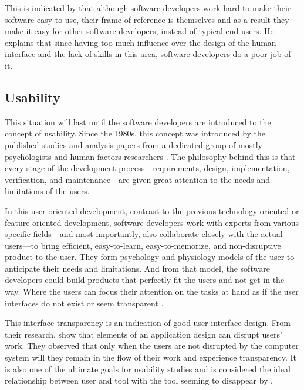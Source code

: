 \documentclass[a4paper,titlepage]{article}
\begin{document}
This is indicated by \citet{inmates:cooper} that although software
developers work hard to make their software easy to use, their frame
of reference is themselves and as a result they make it easy for other
software developers, instead of typical end-users. He explains that
since having too much influence over the design of the human interface
and the lack of skills in this area, software developers do a poor job
of it.

\subsection{Usability}
This situation will last until the software developers are introduced
to the concept of usability. Since the 1980s, this concept was
introduced by the published studies and analysis papers from a
dedicated group of mostly psychologists and human factors researchers
\citep{human:rubinstein, friendly:simpson, human:shneiderman,
  human:brown, software:dumas}. The philosophy behind this is that
every stage of the development process---requirements, design,
implementation, verification, and maintenance---are given great
attention to the needs and limitations of the users.

In this user-oriented development, contrast to the previous
technology-oriented or feature-oriented development, software
developers work with experts from various specific fields---and most
importantly, also collaborate closely with the actual users---to bring
efficient, easy-to-learn, easy-to-memorize, and non-disruptive product
to the user. They form psychology and physiology models of the user to
anticipate their needs and limitations. And from that model, the
software developers could build products that perfectly fit the users
and not get in the way. Where the users can focus their attention on
the tasks at hand as if the user interfaces do not exist or seem
transparent \citep{computer:weiser}.

This interface transparency is an indication of good user interface
design. From their research, \citet{transparency:holtzblatt} show that
elements of an application design can disrupt users' work. They
observed that only when the users are not disrupted by the computer
system will they remain in the flow of their work and experience
transparency. It is also one of the ultimate goals for usability
studies and is considered the ideal relationship between user and tool
with the tool seeming to disappear by \citet{transparency:rutkoski}.
\end{document}
